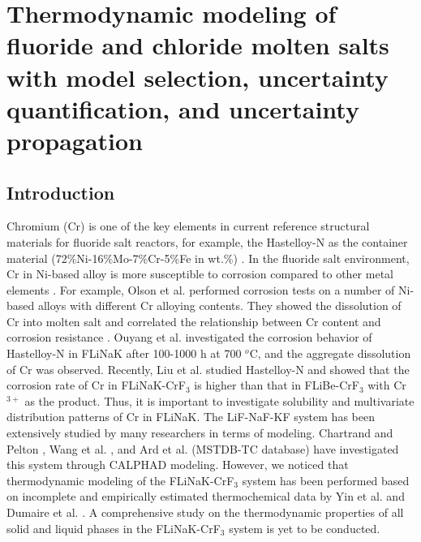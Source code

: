 \chapter{Thermodynamic modeling of fluoride and chloride molten salts with model selection, uncertainty quantification, and uncertainty propagation} \label{chap:moltensalts}

\section{Introduction} \label{moltensalts:sec:intro}
Chromium (Cr) is one of the key elements in current reference structural materials for fluoride salt reactors, for example, the Hastelloy-N as the container material (72\%Ni-16\%Mo-7\%Cr-5\%Fe in wt.\%) \cite{koger1972evaluation, manly1958metallurgical}. In the fluoride salt environment, Cr in Ni-based alloy is more susceptible to corrosion compared to other metal elements \cite{olson2009materials, ouyang2014long, liu2020corrosion}. For example, Olson et al. \cite{olson2009materials} performed corrosion tests on a number of Ni-based alloys with different Cr alloying contents. They showed the dissolution of Cr into molten salt and correlated the relationship between Cr content and corrosion resistance \cite{olson2009materials}. Ouyang et al. \cite{ouyang2014long} investigated the corrosion behavior of Hastelloy-N in FLiNaK after 100-1000 h at 700 $^o$C, and the aggregate dissolution of Cr was observed. Recently, Liu et al. \cite{liu2020corrosion} studied Hastelloy-N and showed that the corrosion rate of Cr in FLiNaK-CrF$_3$ is higher than that in FLiBe-CrF$_3$ with Cr$^{3+}$ as the product. Thus, it is important to investigate solubility and multivariate distribution patterns of Cr in FLiNaK. The LiF-NaF-KF system has been extensively studied by many researchers in terms of modeling. Chartrand and Pelton \cite{chartrand2001thermodynamic}, Wang et al. \cite{wang2014phase}, and Ard et al. (MSTDB-TC database) \cite{ard2022development} have investigated this system through CALPHAD modeling. However, we noticed that thermodynamic modeling of the FLiNaK-CrF$_3$ system has been performed based on incomplete and empirically estimated thermochemical data by Yin et al. \cite{yin2018thermodynamic, yin2015thermodynamic} and Dumaire et al. \cite{dumaire2021thermodynamic}. A comprehensive study on the thermodynamic properties of all solid and liquid phases in the FLiNaK-CrF$_3$ system is yet to be conducted.

